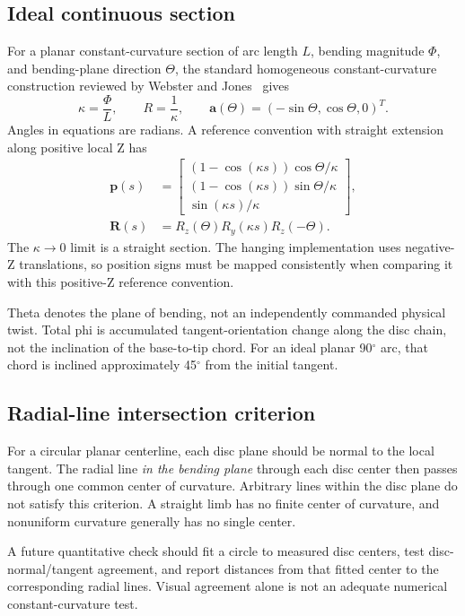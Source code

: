 \documentclass[11pt,letterpaper]{article}
\newcommand{\degrees}{\ensuremath{^{\circ}}}
\begin{document}
\subsection{Ideal continuous section}
For a planar constant-curvature section of arc length $L$, bending magnitude
$\Phi$, and bending-plane direction $\Theta$, the standard homogeneous
constant-curvature construction reviewed by Webster and Jones~\cite{webster2010}
gives
\begin{equation}
\kappa=\frac{\Phi}{L},\qquad R=\frac{1}{\kappa},\qquad
\mathbf{a}(\Theta)=(-\sin\Theta,\cos\Theta,0)^T.
\end{equation}
Angles in equations are radians. A reference convention with straight
extension along positive local Z has
\begin{align}
\mathbf{p}(s)&=\begin{bmatrix}
(1-\cos(\kappa s))\cos\Theta/\kappa\\
(1-\cos(\kappa s))\sin\Theta/\kappa\\
\sin(\kappa s)/\kappa
\end{bmatrix},\\
\mathbf{R}(s)&=R_z(\Theta)R_y(\kappa s)R_z(-\Theta).
\end{align}
The $\kappa\rightarrow0$ limit is a straight section. The hanging implementation
uses negative-Z translations, so position signs must be mapped consistently
when comparing it with this positive-Z reference convention.

Theta denotes the plane of bending, not an independently commanded physical
twist. Total phi is accumulated tangent-orientation change along the disc
chain, not the inclination of the base-to-tip chord. For an ideal planar
90\degrees{} arc, that chord is inclined
approximately 45\degrees{} from the initial tangent.

\subsection{Radial-line intersection criterion}
For a circular planar centerline, each disc plane should be normal to the local
tangent. The radial line \emph{in the bending plane} through each disc center
then passes through one common center of curvature. Arbitrary lines within
the disc plane do not satisfy this criterion. A straight limb has no finite
center of curvature, and nonuniform curvature generally has no single center.

A future quantitative check should fit a circle to measured disc centers,
test disc-normal/tangent agreement, and report distances from that fitted
center to the corresponding radial lines. Visual agreement alone is not an
adequate numerical constant-curvature test.
\end{document}
